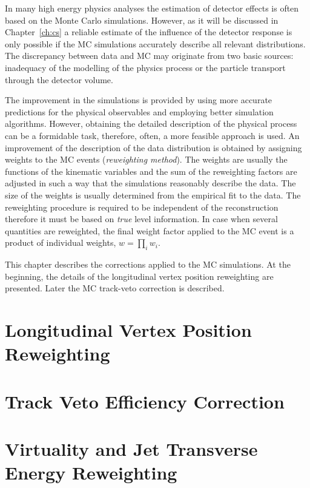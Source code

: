  In many high energy physics analyses the estimation of detector effects is often based on the Monte Carlo simulations. However, as it will be discussed in Chapter~\ref{ch:cs} a reliable estimate of the influence of the detector response is only possible if the MC simulations accurately describe all relevant distributions. %
 The discrepancy between data and MC may originate from two basic sources: inadequacy of the modelling of the physics process or the particle transport through the detector volume.
 
 The improvement in the simulations is provided by using more accurate predictions for the physical observables and employing better simulation algorithms. However, obtaining the detailed description of the physical process can be a formidable task, therefore, often, a more feasible approach is used. An improvement of the description of the data distribution is obtained by assigning weights to the MC events (\emph{reweighting method}). The weights are usually the functions of the kinematic variables and the sum of the reweighting factors are adjusted in such a way that the simulations reasonably describe the data. The size of the weights is usually determined from the empirical fit to the data. The reweighting procedure is required to be independent of the reconstruction therefore it must be based on \emph{true} level information. In case when several quantities are reweighted, the final weight factor applied to the MC event is a product of individual weights, $w = \prod_i w_i$.
 
 This chapter describes the corrections applied to the MC simulations. At the beginning, the details of the longitudinal vertex position reweighting are presented. Later the MC track-veto correction is described.

 \section{Longitudinal Vertex Position Reweighting}
 
 
 \section{Track Veto Efficiency Correction}
 

\section{Virtuality and Jet Transverse Energy Reweighting}
\label{sec:q2etrew}

 \newpage
